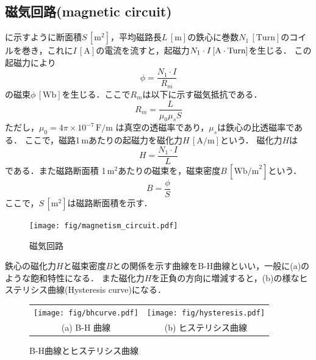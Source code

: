 \subsection{磁気回路(magnetic circuit)}
に示すように断面積$S\,[\mathrm{m}^2]$，平均磁路長$L\,[\mathrm{m}]$の鉄心に巻数$N_1\,[\mathrm{Turn}]$のコイルを巻き，これに$I\,[\mathrm{A}]$の電流を流すと，起磁力$N_1\cdot I\,[\mathrm{A}\cdot\rm{Turn}]$を生じる．
この起磁力により
\begin{equation}
	\phi = \frac{N_1\cdot I}{R_m}
\end{equation}
の磁束$\phi\,[\mathrm{Wb}]$を生じる．ここで$R_m$は以下に示す磁気抵抗である．
\begin{equation}
	R_m= \frac{L}{\mu_0 \mu_s S}
\end{equation}
ただし，$\mu_0 = 4\pi\times 10^{-7}\,\mathrm{F/m}$ は真空の透磁率であり，$\mu_s$は鉄心の比透磁率である．
ここで，磁路1\,mあたりの起磁力を磁化力$H\,[\mathrm{A/m}]$という． 磁化力$H$は
\begin{equation}
	H=\frac{N_1\cdot I}{L}
\end{equation}
である．また磁路断面積 1\,m$^2$あたりの磁束を，磁束密度$B\,[\mathrm{Wb/m}^2]$という．
\begin{equation}
	B=\frac{\phi}{S}
	\label{eq:hys:BphiS}
\end{equation}
ここで，$S\,[\mathrm{m}^2]$は磁路断面積を示す．
\begin{figure}[htbp]
	\centering
	\texttt{[image: fig/magnetism\_circuit.pdf]}
	\caption{磁気回路}
	\label{fig:hys:jikikairo}
\end{figure}

鉄心の磁化力$H$と磁束密度$B$との関係を示す曲線をB-H曲線といい，一般に(a)のような飽和特性になる．
また磁化力$H$を正負の方向に増減すると，(b)の様なヒステリシス曲線(Hysteresis curve)になる．
\begin{figure}[htbp]
	\centering
	\begin{tabular}{cc}
		\texttt{[image: fig/bhcurve.pdf]} &
		\texttt{[image: fig/hysteresis.pdf]} \\
		(a) B-H 曲線 & (b) ヒステリシス曲線
	\end{tabular}
	\caption{B-H曲線とヒステリシス曲線}
	\label{fig:hys:bhcurve}
\end{figure}

